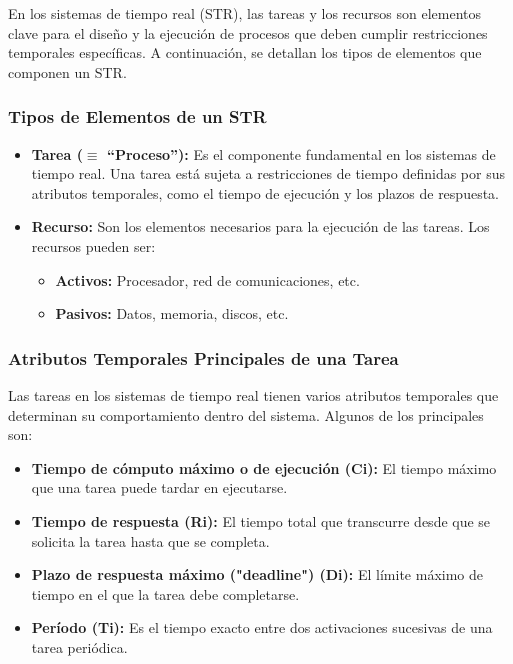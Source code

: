 \documentclass[a4paper,12pt]{article}
\begin{document}
En los sistemas de tiempo real (STR), las tareas y los recursos son elementos clave para el diseño y la ejecución de procesos que deben cumplir restricciones temporales específicas. A continuación, se detallan los tipos de elementos que componen un STR.

\subsubsection{Tipos de Elementos de un STR}

\begin{itemize}
    \item \textbf{Tarea ($\equiv$ ``Proceso''):} Es el componente fundamental en los sistemas de tiempo real. Una tarea está sujeta a restricciones de tiempo definidas por sus atributos temporales, como el tiempo de ejecución y los plazos de respuesta.
    \item \textbf{Recurso:} Son los elementos necesarios para la ejecución de las tareas. Los recursos pueden ser:
    \begin{itemize}
        \item \textbf{Activos:} Procesador, red de comunicaciones, etc.
        \item \textbf{Pasivos:} Datos, memoria, discos, etc.
    \end{itemize}
\end{itemize}

\subsubsection{Atributos Temporales Principales de una Tarea}

Las tareas en los sistemas de tiempo real tienen varios atributos temporales que determinan su comportamiento dentro del sistema. Algunos de los principales son:
\begin{itemize}
    \item \textbf{Tiempo de cómputo máximo o de ejecución (Ci):} El tiempo máximo que una tarea puede tardar en ejecutarse.
    \item \textbf{Tiempo de respuesta (Ri):} El tiempo total que transcurre desde que se solicita la tarea hasta que se completa.
    \item \textbf{Plazo de respuesta máximo ("deadline") (Di):} El límite máximo de tiempo en el que la tarea debe completarse.
    \item \textbf{Período (Ti):} Es el tiempo exacto entre dos activaciones sucesivas de una tarea periódica.
\end{itemize}
\end{document}
